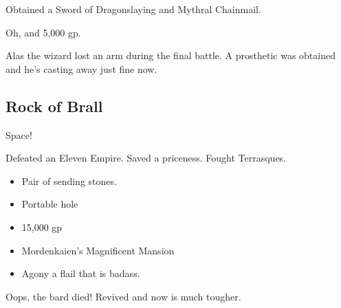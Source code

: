 \documentclass[10pt,a4paper,twoside,fancy,twocolumn,openany,nodeprecatedcode]{dndbook}
\begin{document}
Obtained a Sword of Dragonslaying and Mythral Chainmail.

Oh, and 5,000 gp.

Alas the wizard lost an arm during the final battle. A prosthetic was obtained and he's casting away just fine now.

\subsection{Rock of Brall}

Space!

Defeated an Eleven Empire. Saved a priceness. Fought Terrasques.

\begin{itemize}
  \item Pair of sending stones.
  \item Portable hole
  \item 15,000 gp
  \item Mordenkaien's Magnificent Mansion
  \item Agony \textendash a flail that is badass.
\end{itemize}

Oops, the bard died! Revived and now is much tougher.
\end{document}
